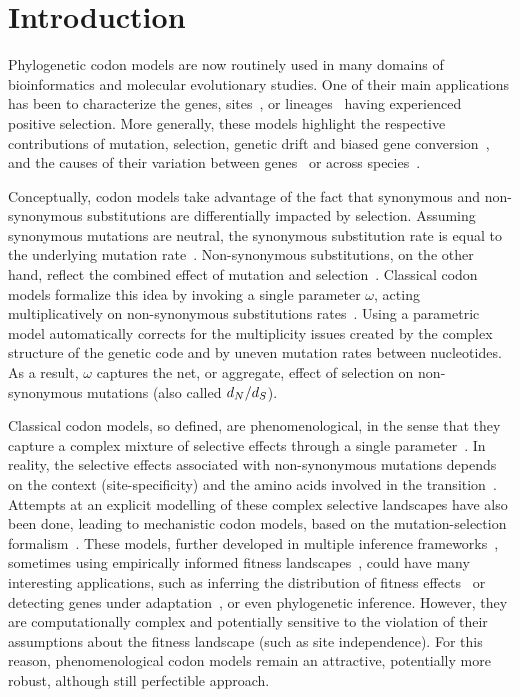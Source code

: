 \documentclass{article}
\begin{document}

\section{Introduction}

Phylogenetic codon models are now routinely used in many domains of bioinformatics and molecular evolutionary studies.
One of their main applications has been to characterize the genes, sites~\citep{Nielsen1998}, or lineages~\citep{Zhang2004} having experienced positive selection.
More generally, these models highlight the respective contributions of mutation, selection, {genetic drift} and biased gene conversion~\citep{Kosiol2019}, and the causes of their variation between genes~\citep{Zhang2015} or across species~\citep{Lartillot2011}.

Conceptually, codon models take advantage of the fact that {synonymous} and {non-synonymous} {substitutions} are differentially impacted by selection.
Assuming {synonymous} mutations are {neutral}, the {synonymous} {substitution} rate is equal to the underlying mutation rate~\citep{kimura1983neutral}.
Non-synonymous {substitutions}, on the other hand, reflect the combined effect of mutation and selection~\citep{Ohta1995}.
Classical codon models formalize this idea by invoking a single parameter $\omega$, acting multiplicatively on {non-synonymous} {substitutions} rates~\citep{Muse1994, Goldman1994}.
Using a parametric model automatically corrects for the multiplicity issues created by the complex structure of the genetic code and by uneven mutation rates between nucleotides.
As a result, $\omega$ captures the net, or aggregate, effect of selection on {non-synonymous} mutations (also called $d_N / d_S$).

Classical codon models, so defined, are phenomenological, in the sense that they capture a complex mixture of selective effects through a single parameter~\citep{Rodrigue2010a}.
In reality, the selective effects associated with {non-synonymous} mutations depends on the context (site-specificity) and the amino acids involved in the transition~\citep{Kosiol2007}.
Attempts at an explicit modelling of these complex selective landscapes have also been done, leading to mechanistic codon models, based on the mutation-selection formalism~\citep{Halpern1998}.
These models, further developed in multiple inference frameworks~\citep{Rodrigue2010, Tamuri2012}, sometimes using empirically informed fitness landscapes~\citep{Bloom2014}, could have many interesting applications, such as inferring the distribution of fitness effects~\citep{Tamuri2012} or detecting genes under adaptation~\citep{Rodrigue2016}, or even phylogenetic inference.
However, they are computationally complex and potentially sensitive to the violation of their assumptions about the fitness landscape (such as site independence).
For this reason, phenomenological codon models remain an attractive, potentially more robust, although still perfectible approach.
\end{document}
